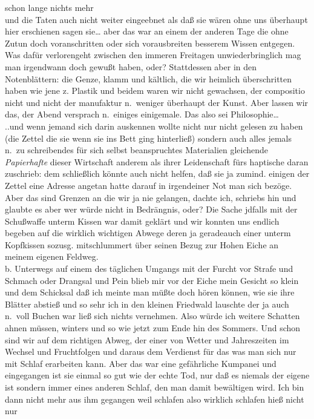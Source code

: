 \documentclass[
]{article}
\begin{document}
schon lange nichts mehr\\
und die Taten auch nicht weiter eingeebnet als daß sie wären ohne uns
überhaupt hier erschienen sagen sie\ldots{} aber das war an einem der
anderen Tage die ohne Zutun doch voranschritten oder sich vorausbreiten
besserem Wissen entgegen. Was dafür verlorengeht zwischen den immeren
Freitagen unwiederbringlich mag man irgendwann doch gewußt haben, oder?
Stattdessen aber in den Notenblättern: die Genze, klamm und kältlich,
die wir heimlich überschritten haben wie jene z. Plastik und beidem
waren wir nicht gewachsen, der compositio nicht und nicht der manufaktur
n.~weniger überhaupt der Kunst. Aber lassen wir das, der Abend versprach
n.~einiges einigemale. Das also sei Philosophie\ldots{}\\
..und wenn jemand sich darin auskennen wollte nicht nur nicht gelesen zu
haben (die Zettel die sie wenn sie ins Bett ging hinterließ) sondern
auch alles jemals n.~zu schreibendes für sich selbst beanspruchtes
Materialien gleichende \emph{Papierhafte} dieser Wirtschaft anderem als
ihrer Leidenschaft fürs haptische daran zuschrieb: dem schließlich
könnte auch nicht helfen, daß sie ja zumind. einigen der Zettel eine
Adresse angetan hatte darauf in irgendeiner Not man sich bezöge. Aber
das sind Grenzen an die wir ja nie gelangen, dachte ich, schriebs hin
und glaubte es aber wer würde nicht in Bedrängnis, oder? Die Sache
jdfalls mit der Schußwaffe unterm Kissen war damit geklärt und wir
konnten uns endlich begeben auf die wirklich wichtigen Abwege deren ja
geradeauch einer unterm Kopfkissen sozusg. mitschlummert über seinen
Bezug zur Hohen Eiche an meinem eigenen Feldweg.\\
b. Unterwegs auf einem des täglichen Umgangs mit der Furcht vor Strafe
und Schmach oder Drangsal und Pein blieb mir vor der Eiche mein Gesicht
so klein und dem Schicksal daß ich meinte man müßte doch hören können,
wie sie ihre Blätter abstieß und so sehr ich in den kleinen Friedwald
lauschte der ja auch n.~voll Buchen war ließ sich nichts vernehmen. Also
würde ich weitere Schatten ahnen müssen, winters und so wie jetzt zum
Ende hin des Sommers. Und schon sind wir auf dem richtigen Abweg, der
einer von Wetter und Jahreszeiten im Wechsel und Fruchtfolgen und daraus
dem Verdienst für das was man sich nur mit Schlaf erarbeiten kann. Aber
das war eine gefährliche Kumpanei und eingegangen ist sie einmal so gut
wie der echte Tod, nur daß es niemals der eigene ist sondern immer eines
anderen Schlaf, den man damit bewältigen wird. Ich bin dann nicht mehr
aus ihm gegangen weil schlafen also wirklich schlafen hieß nicht nur
\end{document}
